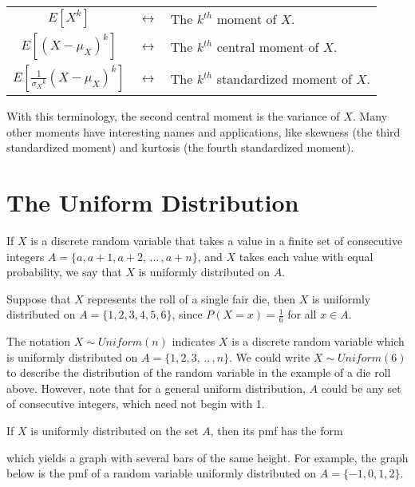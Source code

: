 \begin{center}
\begin{tabular}{ccl}
\vspace*{0.1in}
$E[X^k]$ & $\longleftrightarrow$ & The $k^{th}$ moment of $X$. \\
\vspace*{0.075in}
$E[(X-\mu_X)^k]$ & $\longleftrightarrow$ & The $k^{th}$ central moment of $X$. \\
$E\left[\frac{1}{{\sigma_X}^k}(X - \mu_X)^k\right]$ & $\longleftrightarrow$ & The $k^{th}$ standardized moment of $X$.  \\
\end{tabular}
\end{center}

With this terminology, the second central moment is the variance of $X$. Many other moments have interesting names and applications, like skewness (the third standardized moment) and kurtosis (the fourth standardized moment).

\section{The Uniform Distribution}

\begin{defn} If $X$ is a discrete random variable that takes a value in a finite set of consecutive integers $A = \{a, a+1, a+2, \, \dots \, , a+n\}$, and $X$ takes each value with equal probability, we say that $X$ is uniformly distributed on $A$. \end{defn}

\begin{examp} Suppose that $X$ represents the roll of a single fair die, then $X$ is uniformly distributed on $A = \{1,2,3,4,5,6\}$, since $P(X = x) = \frac{1}{6}$ for all $x \in A$.
\end{examp}

The notation $X \sim Uniform(n)$ indicates $X$ is a discrete random variable which is uniformly distributed on $A = \{1,2,3, \, .. \,, n\}$. We could write $X \sim Uniform(6)$ to describe the distribution of the random variable in the example of a die roll above. However, note that for a general uniform distribution, $A$ could be any set of consecutive integers, which need not begin with 1.
\par
If $X$ is uniformly distributed on the set $A$, then its pmf has the form
\renewcommand*{\arraystretch}{1.35}
\renewcommand*{\arraystretch}{1}
\par
\noindent which yields a graph with several bars of the same height. For example, the graph below is the pmf of a random variable uniformly distributed on $A = \{-1,0,1,2\}$.

